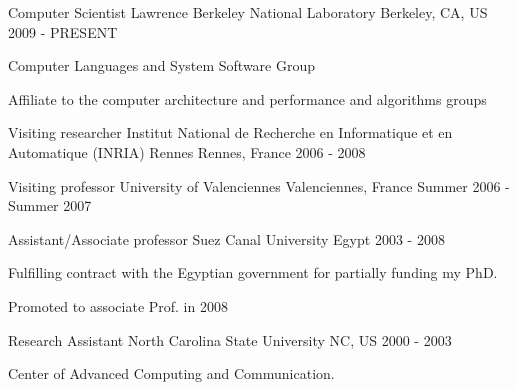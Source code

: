 
\begin{cventries}

  \cventry
    {Computer Scientist} %
    {Lawrence Berkeley National Laboratory} %
    {Berkeley, CA, US} %
    {2009 - PRESENT} %
    {
      \begin{cvitems} %
        \item {Computer Languages and System Software Group}
		\item {Affiliate to the computer architecture and
				performance and algorithms groups}
      \end{cvitems}
    }

  \cventry
    {Visiting researcher} %
    {Institut National de Recherche en Informatique et en Automatique (INRIA) Rennes}
    {Rennes, France} %
    {2006 - 2008} %
    {
    }

  \cventry
    {Visiting professor}
    {University of Valenciennes} %
    {Valenciennes, France} %
    {Summer 2006 - Summer 2007} %
    {
    }


  \cventry
    {Assistant/Associate professor}
    {Suez Canal University} %
    {Egypt} %
    {2003 - 2008} %
    {
      \begin{cvitems} %
        \item {Fulfilling contract with the Egyptian government
 for partially funding my PhD.}
		\item {Promoted to associate Prof. in 2008}
      \end{cvitems}
    }

  \cventry
    {Research Assistant}
	{North Carolina State University} %
    {NC, US} %
    {2000 - 2003} %
    {
        \begin{cvitems} %
        \item {Center of Advanced Computing and  Communication.}
      \end{cvitems}
    }


\end{cventries}
